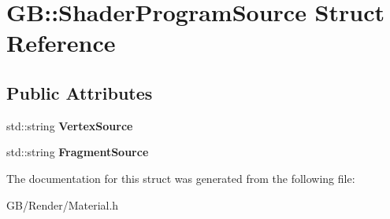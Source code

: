 \hypertarget{struct_g_b_1_1_shader_program_source}{}\section{GB\+::Shader\+Program\+Source Struct Reference}
\label{struct_g_b_1_1_shader_program_source}
\subsection*{Public Attributes}
\begin{DoxyCompactItemize}
\item 
\mbox{\label{struct_g_b_1_1_shader_program_source_a238a38e02f5256885a8d6f0f8a9d7dda}} 
std\+::string {\bfseries Vertex\+Source}
\item 
\mbox{\label{struct_g_b_1_1_shader_program_source_a74b4c49d1cfb87e727cb2f3dc1880014}} 
std\+::string {\bfseries Fragment\+Source}
\end{DoxyCompactItemize}


The documentation for this struct was generated from the following file\+:\begin{DoxyCompactItemize}
\item 
G\+B/\+Render/Material.\+h\end{DoxyCompactItemize}

